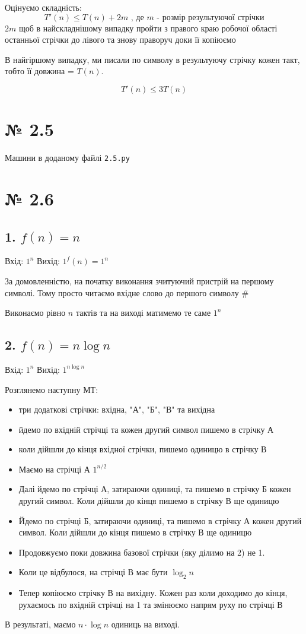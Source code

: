 \documentclass[11pt, a4paper]{article} %
\begin{document}
Оцінуємо складність:
$$T'(n) \le T(n) + 2m \text{ , де $m$ - розмір результуючої стрічки}$$
$2m$ щоб в найскладнішому випадку пройти з правого краю робочої області останньої стрічки 
до лівого та знову праворуч доки її копіюємо

В найгіршому випадку, ми писали по символу в результуючу стрічку кожен такт, тобто її довжина = $T(n)$.
\begin{mdframed}[style=ans]
    $$T'(n) \le 3T(n)$$
\end{mdframed}

\section*{№ 2.5}
Машини в доданому файлі \texttt{2.5.py}

\section*{№ 2.6}
\subsection*{1. $f(n) = n$}
Вхід: $1^n$
Вихід: $1^f(n) = 1^n$

За домовленністю, на початку виконання зчитуючий пристрій на першому символі.
Тому просто читаємо вхідне слово до першого символу \#

Виконаємо рівно $n$ тактів та на виході матимемо те саме $1^n$ \qedsymbol

\subsection*{2. $f(n) = n \log n$}
Вхід: $1^n$
Вихід: $1^{n \log n}$

Розглянемо наступну МТ:
\begin{itemize}
    \item три додаткові стрічки: вхідна, "А", "Б", "В" та вихідна
    \item йдемо по вхідній стрічці та кожен другий символ пишемо в стрічку А
    \item коли дійшли до кінця вхідної стрічки, пишемо одиницю в стрічку В
    \item Маємо на стрічці А $1^{n/2}$
    \item Далі йдемо по стрічці А, затираючи одиниці, та пишемо в стрічку Б кожен другий символ. 
    Коли дійшли до кінця пишемо в стрічку В ще одиницю
    \item Йдемо по стрічці Б, затираючи одиниці, та пишемо в стрічку А кожен другий символ.
    Коли дійшли до кінця пишемо в стрічку В ще одиницю
    \item Продовжуємо поки довжина базової стрічки (яку ділимо на 2) не 1.
    \item Коли це відбулося, на стрічці В має бути $\log_2 n$
    \item Тепер копіюємо стрічку В на вихідну. Кожен раз коли доходимо до кінця, 
    рухаємось по вхідній стрічці на 1 та змінюємо напрям руху по стрічці В
\end{itemize}
В результаті, маємо $n \cdot \log n$ одиниць на виході.
\end{document}
